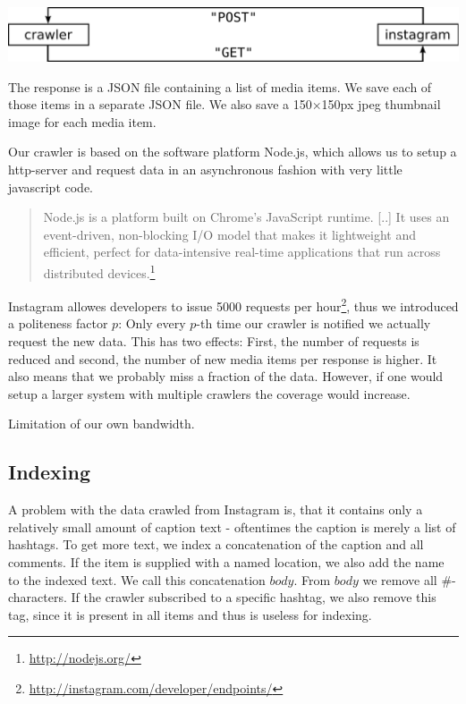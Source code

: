 \documentclass[11pt]{article}
\begin{document}
		\vspace{0.5cm}\includegraphics[width=\textwidth,keepaspectratio]{crawler.pdf}

		The response is a JSON file containing a list of media items. We save each of those items in a separate JSON file. We also save a 150$\times$150px jpeg thumbnail image for each media item.

		Our crawler is based on the software platform Node.js, which allows us to setup a http-server and request data in an asynchronous fashion with very little javascript code.
		\begin{quote}
			Node.js is a platform built on Chrome's JavaScript runtime. [..] It uses an event-driven, non-blocking I/O model that makes it lightweight and efficient, perfect for data-intensive real-time applications that run across distributed devices.\footnote{\url{http://nodejs.org/}}
		\end{quote}

		Instagram allowes developers to issue 5000 requests per hour\footnote{\url{http://instagram.com/developer/endpoints/}}, thus we introduced a politeness factor $p$: Only every $p$-th time our crawler is notified we actually request the new data. This has two effects: First, the number of requests is reduced and second, the number of new media items per response is higher. It also means that we probably miss a fraction of the data. However, if one would setup a larger system with multiple crawlers the coverage would increase.

		Limitation of our own bandwidth.
	\subsection{Indexing}
		A problem with the data crawled from Instagram is, that it contains only a relatively small amount of caption text - oftentimes the caption is merely a list of hashtags. To get more text, we index a concatenation of the caption and all comments. If the item is supplied with a named location, we also add the name to the indexed text. We call this concatenation $body$. From $body$ we remove all $\#$-characters. If the crawler subscribed to a specific hashtag, we also remove this tag, since it is present in all items and thus is useless for indexing.
\end{document}
